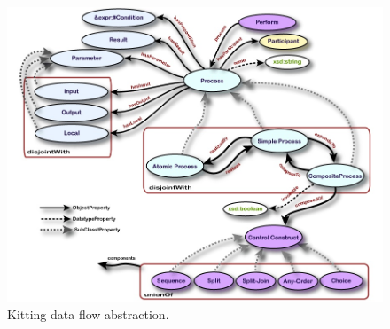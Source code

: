 
\begin{figure}[htb]
\includegraphics[width=16cm]{images/OWL-S.jpg}
\caption{Kitting data flow abstraction.}
\label{fig:ProcessDataFlow}
\end{figure}

